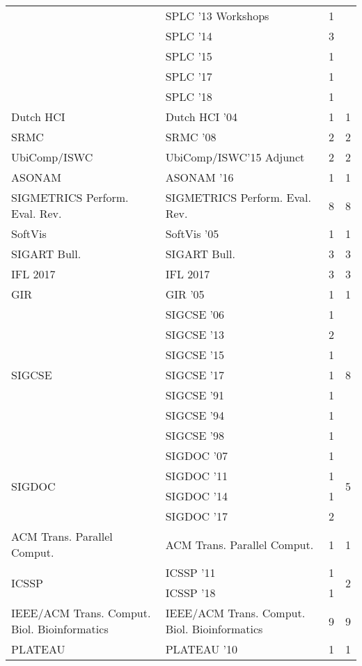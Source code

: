 \begin{table*}[t]
\begin{tabular}{llrr}
& SPLC '13 Workshops & 1 &\\
& SPLC '14 & 3 &\\
& SPLC '15 & 1 &\\
& SPLC '17 & 1 &\\
& SPLC '18 & 1 &\\
\multirow{1}{*}{Dutch HCI } & Dutch HCI '04 & 1 & \multirow{1}{*}{1}\\
\multirow{1}{*}{SRMC } & SRMC '08 & 2 & \multirow{1}{*}{2}\\
\multirow{1}{*}{UbiComp/ISWC} & UbiComp/ISWC'15 Adjunct & 2 & \multirow{1}{*}{2}\\
\multirow{1}{*}{ASONAM } & ASONAM '16 & 1 & \multirow{1}{*}{1}\\
\multirow{1}{*}{SIGMETRICS Perform. Eval. Rev.} & SIGMETRICS Perform. Eval. Rev. & 8 & \multirow{1}{*}{8}\\
\multirow{1}{*}{SoftVis } & SoftVis '05 & 1 & \multirow{1}{*}{1}\\
\multirow{1}{*}{SIGART Bull.} & SIGART Bull. & 3 & \multirow{1}{*}{3}\\
\multirow{1}{*}{IFL 2017} & IFL 2017 & 3 & \multirow{1}{*}{3}\\
\multirow{1}{*}{GIR } & GIR '05 & 1 & \multirow{1}{*}{1}\\
\multirow{7}{*}{SIGCSE } & SIGCSE '06 & 1 & \multirow{7}{*}{8}\\
& SIGCSE '13 & 2 &\\
& SIGCSE '15 & 1 &\\
& SIGCSE '17 & 1 &\\
& SIGCSE '91 & 1 &\\
& SIGCSE '94 & 1 &\\
& SIGCSE '98 & 1 &\\
\multirow{4}{*}{SIGDOC } & SIGDOC '07 & 1 & \multirow{4}{*}{5}\\
& SIGDOC '11 & 1 &\\
& SIGDOC '14 & 1 &\\
& SIGDOC '17 & 2 &\\
\multirow{1}{*}{ACM Trans. Parallel Comput.} & ACM Trans. Parallel Comput. & 1 & \multirow{1}{*}{1}\\
\multirow{2}{*}{ICSSP } & ICSSP '11 & 1 & \multirow{2}{*}{2}\\
& ICSSP '18 & 1 &\\
\multirow{1}{*}{IEEE/ACM Trans. Comput. Biol. Bioinformatics} & IEEE/ACM Trans. Comput. Biol. Bioinformatics & 9 & \multirow{1}{*}{9}\\
\multirow{1}{*}{PLATEAU } & PLATEAU '10 & 1 & \multirow{1}{*}{1}\\

\end{tabular}
\end{table*}
